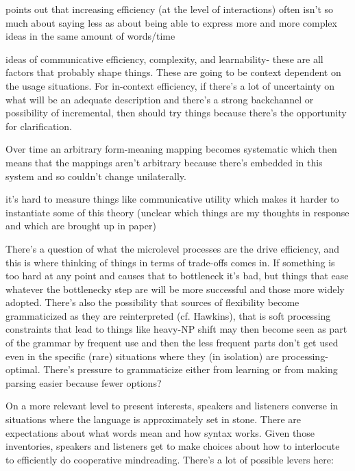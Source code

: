 \documentclass[]{article}
\begin{document}
\cite{hawkins2021} points out that increasing efficiency (at the level of interactions) often isn't so much about saying less as about being able to express more and more complex ideas in the same amount of words/time 

\cite{gibson2019} ideas of communicative efficiency, complexity, and learnability- these are all factors that probably shape things. These are going to be context dependent on the usage situations. For in-context efficiency, if there's a lot of uncertainty on what will be an adequate description and there's a strong backchannel or possibility of incremental, then should try things because there's the opportunity for clarification. 

Over time an arbitrary form-meaning mapping becomes systematic which then means that the mappings aren't arbitrary because there's embedded in this system and so couldn't change unilaterally. 

\cite{gibson2019} it's hard to measure things like communicative utility which makes it harder to instantiate some of this theory (unclear which things are my thoughts in response and which are brought up in paper) 



There's a question of what the microlevel processes are the drive efficiency, and this is where thinking of things in terms of trade-offs comes in. If something is too hard at any point and causes that to bottleneck it's bad, but things that ease whatever the bottlenecky step are will be more successful and those more widely adopted. There's also the possibility that sources of flexibility become grammaticized as they are reinterpreted (cf. Hawkins), that is soft processing constraints that lead to things like heavy-NP shift may then become seen as part of the grammar by frequent use and then the less frequent parts don't get used even in the specific (rare) situations where they (in isolation) are processing-optimal. There's pressure to grammaticize either from learning or from making parsing easier because fewer options? 


On a more relevant level to present interests, speakers and listeners converse in situations where the language is approximately set in stone. There are expectations about what words mean and how syntax works. Given those inventories, speakers and listeners get to make choices about how to interlocute to efficiently do cooperative mindreading. There's a lot of possible levers here: 
\end{document}
